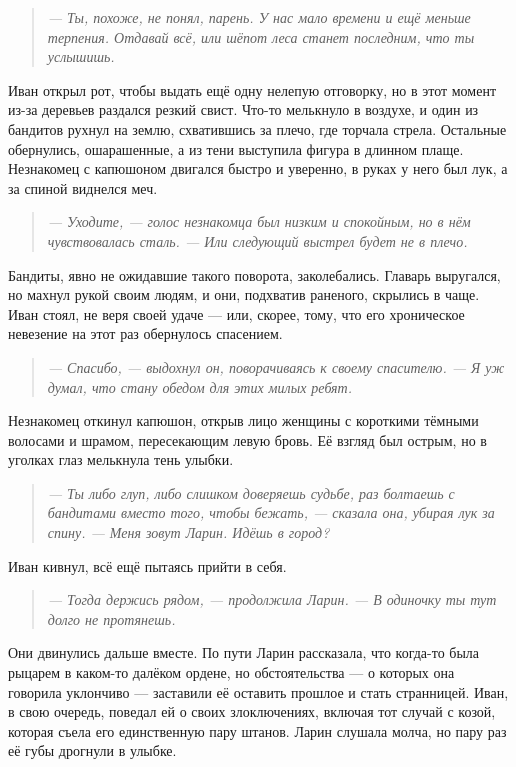 \documentclass[12pt,a4paper]{book}
\newenvironment{dialogue}{\begin{quote}\itshape}{\end{quote}} %
\begin{document}
\begin{dialogue}
--- Ты, похоже, не понял, парень. У нас мало времени и ещё меньше терпения. Отдавай всё, или шёпот леса станет последним, что ты услышишь.
\end{dialogue}

Иван открыл рот, чтобы выдать ещё одну нелепую отговорку, но в этот момент из-за деревьев раздался резкий свист. Что-то мелькнуло в воздухе, и один из бандитов рухнул на землю, схватившись за плечо, где торчала стрела. Остальные обернулись, ошарашенные, а из тени выступила фигура в длинном плаще. Незнакомец с капюшоном двигался быстро и уверенно, в руках у него был лук, а за спиной виднелся меч.

\begin{dialogue}
--- Уходите, --- голос незнакомца был низким и спокойным, но в нём чувствовалась сталь. --- Или следующий выстрел будет не в плечо.
\end{dialogue}

Бандиты, явно не ожидавшие такого поворота, заколебались. Главарь выругался, но махнул рукой своим людям, и они, подхватив раненого, скрылись в чаще. Иван стоял, не веря своей удаче --- или, скорее, тому, что его хроническое невезение на этот раз обернулось спасением.

\begin{dialogue}
--- Спасибо, --- выдохнул он, поворачиваясь к своему спасителю. --- Я уж думал, что стану обедом для этих милых ребят.
\end{dialogue}

Незнакомец откинул капюшон, открыв лицо женщины с короткими тёмными волосами и шрамом, пересекающим левую бровь. Её взгляд был острым, но в уголках глаз мелькнула тень улыбки.

\begin{dialogue}
--- Ты либо глуп, либо слишком доверяешь судьбе, раз болтаешь с бандитами вместо того, чтобы бежать, --- сказала она, убирая лук за спину. --- Меня зовут Ларин. Идёшь в город?
\end{dialogue}

Иван кивнул, всё ещё пытаясь прийти в себя.

\begin{dialogue}
--- Тогда держись рядом, --- продолжила Ларин. --- В одиночку ты тут долго не протянешь.
\end{dialogue}

Они двинулись дальше вместе. По пути Ларин рассказала, что когда-то была рыцарем в каком-то далёком ордене, но обстоятельства --- о которых она говорила уклончиво --- заставили её оставить прошлое и стать странницей. Иван, в свою очередь, поведал ей о своих злоключениях, включая тот случай с козой, которая съела его единственную пару штанов. Ларин слушала молча, но пару раз её губы дрогнули в улыбке.
\end{document}
